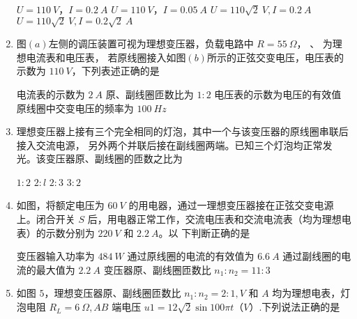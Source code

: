 \begin{enumerate}
\fourchoices
{$ U=110 \ V $，$ I=0.2 \ A $}
{$ U=110 \ V $，$ I=0.05 \ A $}
{$ U=110\sqrt{2} \ V ,I=0.2 \ A $}
{$ U=110\sqrt{2} \ V ,I=0.2\sqrt{2} \ A $}




\item 
{}
图$ (a) $左侧的调压装置可视为理想变压器，负载电路中 $ R=55 \ \Omega $， \ammetermytikz 、 \voltmetermytikz 
为理想电流表和电压表，
若原线圈接入如图$ (b) $所示的正弦交变电压，电压表的示数为 $ 110 \ V $，下列表述正确的是  
\begin{figure}[h!]
\centering
\begin{subfigure}{0.4\linewidth}
\centering
 
\caption{}\label{}
\end{subfigure}
\begin{subfigure}{0.4\linewidth}
\centering
 
\caption{}\label{}
\end{subfigure}
\end{figure}

\fourchoices
{电流表的示数为 $ 2 \ A $}
{原、副线圈匝数比为 $ 1:2 $}
{电压表的示数为电压的有效值}
{原线圈中交变电压的频率为 $ 100 \ Hz $}

\item 
{}
理想变压器上接有三个完全相同的灯泡，其中一个与该变压器的原线圈串联后接入交流电源，
另外两个并联后接在副线圈两端。已知三个灯泡均正常发光。该变压器原、副线圈的匝数之比为  

\fourchoices
{$ 1:2 $}
{$ 2:l $}
{$ 2:3 $}
{$ 3:2 $}


\item 
{}
如图，将额定电压为 $ 60 \ V $ 的用电器，通过一理想变压器接在正弦交变电源上。闭合开关 $ S $
后，用电器正常工作，交流电压表和交流电流表（均为理想电表）的示数分别为 $ 220 \ V $ 和 $ 2.2 \ A $。以
下判断正确的是  
\begin{figure}[h!]
\centering

\end{figure}


\fourchoices
{变压器输入功率为 $ 484 \ W $}
{通过原线圈的电流的有效值为 $ 6.6 \ A $}
{通过副线圈的电流的最大值为 $ 2.2 \ A $}
{变压器原、副线圈匝数比 $ n_{1} : n_{2} =11:3 $}



\item 
{}
如图 $ 5 $，理想变压器原、副线圈匝数比 $ n_{1} : n_{2} =2:1,V $ 和 $ A $ 均为理想电表，灯泡电阻 $ R_{L} =6 \ \Omega ,AB $
端电压 $ u1=12\sqrt{2} \sin 100 \pi t $（$ V $）.下列说法正确的是  
\begin{figure}[h!]
\centering

\end{figure}


\end{enumerate}

